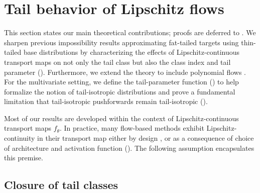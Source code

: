 \documentclass{article}
\theoremstyle{definition}
\newtheorem{assumption}[theorem]{Assumption}
\theoremstyle{remark}
\begin{document}
\vspace{-2mm}
\section{Tail behavior of Lipschitz flows}

\vspace{-1mm}
This section states our main theoretical contributions; proofs are deferred to .
We sharpen previous impossibility results approximating fat-tailed targets
using thin-tailed base distributions \citep[Theorem 4]{jaini2020tails}
by characterizing the effects of Lipschitz-continuous transport maps on not only the tail class
but also the class index and tail parameter (). Furthermore, we extend the theory
to include polynomial flows \cite{jaini2019sum}. For the multivariate setting,
we define the tail-parameter function () to help formalize the notion
of tail-isotropic distributions and prove a fundamental limitation that tail-isotropic
pushforwards remain tail-isotropic ().

Most of our results are developed within the context of Lipschitz-continuous transport maps $f_\theta$.
In practice, many flow-based methods exhibit Lipschitz-continuity in their transport map either by design \citep{grathwohl2018ffjord,chen2019residual}, or as a consequence of choice of architecture and activation function (). %
%
The following assumption encapsulates this premise.


\vspace{-2mm}
\subsection{Closure of tail classes}
\label{ssec:failure}
\end{document}

